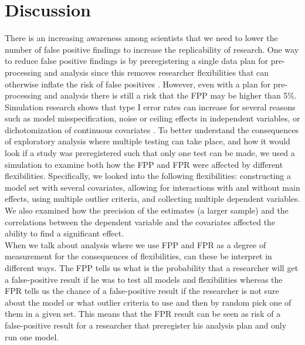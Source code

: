 \section{Discussion}
There is an increasing awareness among scientists that we need to  lower the number of false positive findings to increase the replicability of research. One way to reduce false positive findings is by preregistering a single data plan for pre-processing and analysis since this removes researcher flexibilities that can otherwise inflate the risk of false positives \citep{Simmons2018}. However, even with a plan for pre-processing and analysis there is still a risk that the FPP may be higher than 5\%. Simulation research shows that type I error rates can increase for several reasons such as model misspecification, noise or ceiling effects in independent variables, or dichotomization of continuous covariates \citep{Dennis2019, Litiere2007, Brunner2009, Austin2003, Austin2004}. To better understand the consequences of exploratory analysis where multiple testing can take place, and how it would look if a study was preregistered such that only one test can be made, we used a simulation to examine both how the FPP and FPR were affected by different flexibilities. Specifically, we looked into the following flexibilities: constructing a model set with several covariates, allowing for interactions with and without main effects, using multiple outlier criteria, and collecting multiple dependent variables. We also examined how the precision of the estimates (a larger sample) and the correlations between the dependent variable and the covariates affected the ability to find a significant effect. \\

When we talk about analysis where we use FPP and FPR as a degree of measurement for the consequences of flexibilities, can these be interpret in different ways. The FPP tells us what is the probability that a researcher will get a false-positive result if he was to test all models and flexibilities whereas the FPR tells us the chance of a false-positive result if the researcher is not sure about the model or what outlier criteria to use and then by random pick one of them in a given set. This means that the FPR result can be seen as risk of a  false-positive result for a researcher that preregister his analysis plan and only run one model.\\ 

